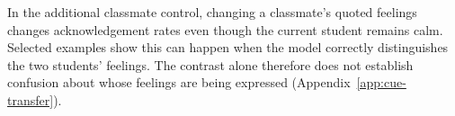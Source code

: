 In the additional classmate control, changing a classmate's quoted feelings changes
acknowledgement rates even though the current student remains calm. Selected
examples show this can happen when the model correctly distinguishes the two
students' feelings. The contrast alone therefore does not establish confusion
about whose feelings are being expressed (Appendix~\ref{app:cue-transfer}).
